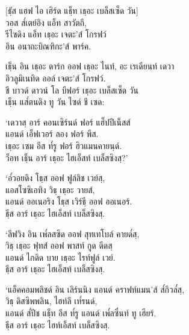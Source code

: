 \begin{english}
\begin{english}
[ธฺัส แฮฟ ไอ เฮิร์ด แธฺ็ท เธฺอะ เบล็สเซ็ด วัน]\\
วอส ส๎เตย์อิง แอ็ท สาวัตถี,\\
รีไซดิง แอ็ท เธฺอะ เจตะ’ส์ โกรฟว์\\
อิน อนาถะบิณฑิกะ’ส์ พาร์ค.
\end{english}

\begin{english}
เธฺ็น อิน เธฺอะ ดาร์ก ออฟ เธฺอะ ไนท์, อะ เรเดียนท์ เดวา\\
อิวลูมิเนทิด ออล์ เจตะ’ส์ โกรฟว์.\\
ชี บาวด์ ดาวน์ โล บีฟอร์ เธฺอะ เบล็สเซ็ด วัน\\
เธฺ็น แส๎ตนดิง ทู วัน ไซด์ ชี เซด:
\end{english}

\begin{english}
‘เดวาสฺ อาร์ คอนเซิร์นด์ ฟอร์ แฮ็ปปีเน็สส์\\
แอนด์ เอ็ฟเวอร์ ลอง ฟอร์ พีส.\\
เธฺอะ เซม อีส ท๎รู ฟอร์ ฮิวแมนคายนฺด์.\\
ว็อท เธฺ็น อาร์ เธฺอะ ไฮเอ็สท์ เบล็สซิงสฺ?’
\end{english}

\begin{english}
‘อ๎วอยดิง โธฺส ออฟ ฟูล์ลิช เวย์สฺ,\\
แอสโซซิเอทิง วิธฺ เธฺอะ วายส์,\\
แอนด์ ออเนอริง โธฺส เวิร์ธฺี ออฟ ออเนอร์.\\
ธฺีส อาร์ เธฺอะ ไฮเอ็สท์ เบล็สซิงสฺ.
\end{english}

\begin{english}
‘ลีฟวิง อิน เพ๎ลสซิด ออฟ สุทเทโบล์ คายด๎สฺ,\\
วิธฺ เธฺอะ ฟุทส์ ออฟ พาสท์ กูด ดีดสฺ\\
แอนด์ ไกดิด บาย เธฺอะ ไรท์ฟูล์ เวย์.\\
ธฺีส อาร์ เธฺอะ ไฮเอ็สท์ เบล็สซิงสฺ.
\end{english}

\begin{english}
‘แอ็คคอมพลิชด์ อิน เลิร์นนิง แอนด์ คราฟท์แมน’ส์ ส๎กิวล๎สฺ,\\
วิธฺ ดิสซิพพลิน, ไฮท์ลี เท๎รนด์,\\
แอนด์ ส๎ปีช แธฺ็ท อีส ท๎รู แอนด์ เพ๎ลซึ่นท์ ทู เฮียร์.\\
ธฺีส อาร์ เธฺอะ ไฮท์เอ็สท์ เบล็สซิงสฺ.
\end{english}


\end{english}
